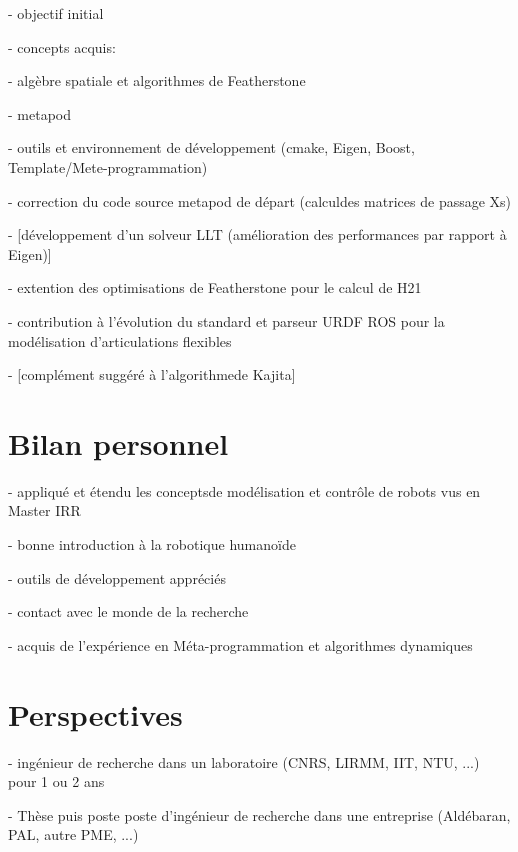 \documentclass{report}
\begin{document}
- objectif initial

- concepts acquis:

	- algèbre spatiale et algorithmes de Featherstone
	
	- metapod
	
	- outils et environnement de développement (cmake, Eigen, Boost, Template/Mete-programmation)

- correction du code source metapod de départ (calculdes matrices de passage Xs)

- [développement d'un solveur LLT (amélioration des performances par rapport à Eigen)]

- extention des optimisations de Featherstone pour le calcul de H21

- contribution à l'évolution du standard et parseur URDF ROS pour la modélisation d'articulations flexibles

- [complément suggéré à l'algorithmede Kajita]


\section*{Bilan personnel}

- appliqué et étendu les conceptsde modélisation et contrôle de robots vus en Master IRR

- bonne introduction à la robotique humanoïde

- outils de développement appréciés

- contact avec le monde de la recherche

- acquis de l'expérience en Méta-programmation et algorithmes dynamiques


\section*{Perspectives}

- ingénieur de recherche dans un laboratoire (CNRS, LIRMM, IIT, NTU, ...) pour 1 ou 2 ans

- Thèse puis poste poste d'ingénieur de recherche dans une entreprise (Aldébaran, PAL, autre PME, ...)



\appendix




\clearpage
{}

\end{document}
